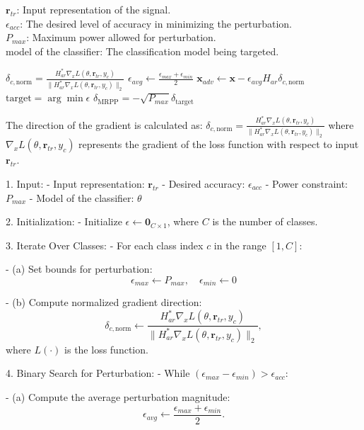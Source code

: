 
$\mathbf{r}_{tr}$: Input representation of the signal. \\
$\epsilon_{acc}$: The desired level of accuracy in minimizing the perturbation. \\
$P_{max}$: Maximum power allowed for perturbation. \\
model of the classifier: The classification model being targeted.

$\delta_{c,\text{norm}} = \frac{H_{ar}^* \nabla_x L(\theta, \mathbf{r}_{tr}, y_c)}{\|H_{ar}^* \nabla_x L(\theta, \mathbf{r}_{tr}, y_c)\|_2}$
$\epsilon_{avg} \leftarrow \frac{\epsilon_{max} + \epsilon_{min}}{2}$
$\mathbf{x}_{adv} \leftarrow \mathbf{x} - \epsilon_{avg} H_{ar} \delta_{c,\text{norm}}$
$\text{target} = \arg \min \epsilon$
$\delta_{\text{MRPP}} = -\sqrt{P_{max}} \delta_{\text{target}}$

The direction of the gradient is calculated as:
$\delta_{c,\text{norm}} = \frac{H_{ar}^* \nabla_x L(\theta, \mathbf{r}_{tr}, y_c)}{\|H_{ar}^* \nabla_x L(\theta, \mathbf{r}_{tr}, y_c)\|_2}$
where $\nabla_x L(\theta, \mathbf{r}_{tr}, y_c)$ represents the gradient of the loss function with respect to input $\mathbf{r}_{tr}$.

1. Input:
   - Input representation: $\mathbf{r}_{tr}$
   - Desired accuracy: $\epsilon_{acc}$
   - Power constraint: $P_{max}$
   - Model of the classifier: $\theta$

2. Initialization:
   - Initialize $\epsilon \gets \mathbf{0}_{C \times 1}$, where $C$ is the number of classes.

3. Iterate Over Classes:
   - For each class index $c$ in the range $[1, C]$:
     
     - (a) Set bounds for perturbation:
       \[
       \epsilon_{max} \gets P_{max}, \quad \epsilon_{min} \gets 0
       \]

     - (b) Compute normalized gradient direction:
       \[
       \delta_{c,\text{norm}} \gets \frac{H_{ar}^* \nabla_x L(\theta, \mathbf{r}_{tr}, y_c)}{\|H_{ar}^* \nabla_x L(\theta, \mathbf{r}_{tr}, y_c)\|_2},
       \]
       where $L(\cdot)$ is the loss function.

4. Binary Search for Perturbation:
   - While $(\epsilon_{max} - \epsilon_{min}) > \epsilon_{acc}$:
     
     - (a) Compute the average perturbation magnitude:
       \[
       \epsilon_{avg} \gets \frac{\epsilon_{max} + \epsilon_{min}}{2}.
       \]


